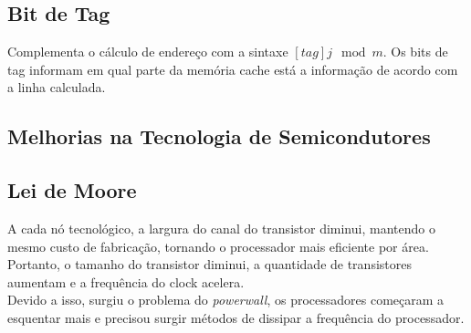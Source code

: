 \documentclass{article}
\begin{document}
		\subsection{Bit de Tag}
			Complementa o cálculo de endereço com a sintaxe $[tag]j \mod m$. Os bits de tag informam em qual parte da memória cache está a informação de acordo com a linha calculada.
		\subsection{Melhorias na Tecnologia de Semicondutores}
			\subsection{Lei de Moore}
				A cada nó tecnológico, a largura do canal do transistor diminui, mantendo o mesmo custo de fabricação, tornando o processador mais eficiente por área. Portanto, o tamanho do transistor diminui, a quantidade de transistores aumentam e a frequência do clock acelera.\\
				Devido a isso, surgiu o problema do \textit{powerwall}, os processadores começaram a esquentar mais e precisou surgir métodos de dissipar a frequência do processador.	
\end{document}
